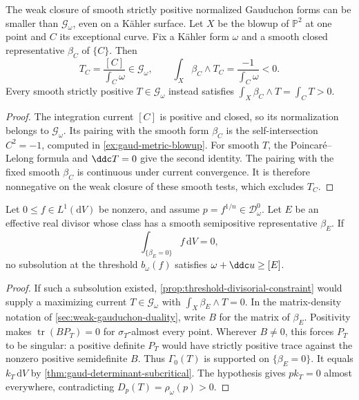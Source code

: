\begin{example}\label{ex:gauduchon-current-smoothing-obstruction}
The weak closure of smooth strictly positive normalized Gauduchon forms can be smaller than $\mathscr G_\omega$, even on a K\"ahler surface. Let $X$ be the blowup of $\mathbb P^2$ at one point and $C$ its exceptional curve. Fix a K\"ahler form $\omega$ and a smooth closed representative $\beta_C$ of $\{C\}$. Then
\[
 T_C=\frac{[C]}{\int_C\omega}\in\mathscr G_\omega,
 \qquad
 \int_X\beta_C\wedge T_C=\frac{-1}{\int_C\omega}<0.
\]
Every smooth strictly positive $T\in\mathscr G_\omega$ instead satisfies
$\int_X\beta_C\wedge T=\int_C T>0$.
\end{example}
\begin{proof}
The integration current $[C]$ is positive and closed, so its normalization belongs to $\mathscr G_\omega$. Its pairing with the smooth form $\beta_C$ is the self-intersection $C^2=-1$, computed in \cref{ex:gaud-metric-blowup}. For smooth $T$, the Poincar\'e--Lelong formula and $\ddc T=0$ give the second identity. The pairing with the fixed smooth $\beta_C$ is continuous under current convergence. It is therefore nonnegative on the weak closure of these smooth tests, which excludes $T_C$.
\end{proof}

\begin{corollary}\label{cor:semipositive-divisor-exclusion}
Let $0\leq f\in L^1(\mathrm{d}V)$ be nonzero, and assume $p=f^{1/n}\in\mathcal D_\omega^0$. Let $E$ be an effective real divisor whose class has a smooth semipositive representative $\beta_E$. If
\[
 \int_{\{\beta_E=0\}}f\,\mathrm{d}V=0,
\]
no subsolution at the threshold $b_\omega(f)$ satisfies $\omega+\ddc u\geq[E]$.
\end{corollary}
\begin{proof}
If such a subsolution existed, \cref{prop:threshold-divisorial-constraint} would supply a maximizing current $T\in\mathscr G_\omega$ with $\int_X\beta_E\wedge T=0$. In the matrix-density notation of \cref{sec:weak-gauduchon-duality}, write $B$ for the matrix of $\beta_E$. Positivity makes $\operatorname{tr}(BP_T)=0$ for $\sigma_T$-almost every point. Wherever $B\ne0$, this forces $P_T$ to be singular: a positive definite $P_T$ would have strictly positive trace against the nonzero positive semidefinite $B$. Thus $\Gamma_0(T)$ is supported on $\{\beta_E=0\}$. It equals $k_T\,\mathrm{d}V$ by \cref{thm:gaud-determinant-subcritical}. The hypothesis gives $p k_T=0$ almost everywhere, contradicting $D_p(T)=\rho_\omega(p)>0$.
\end{proof}

